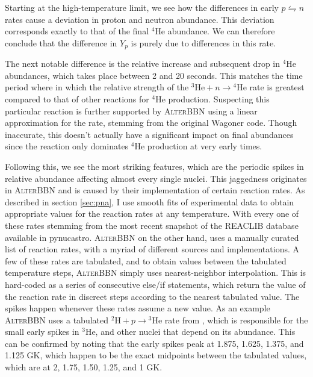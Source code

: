 Starting at the high-temperature limit, we see how the differences in early $p\leftrightharpoons n$ rates cause a deviation in proton and neutron abundance. This deviation corresponds exactly to that of the final ${}^4$He abundance. We can therefore conclude that the difference in $Y_p$ is purely due to differences in this rate. 

The next notable difference is the relative increase and subsequent drop in ${}^4\text{He}$ abundances, which takes place between 2 and 20 seconds. This matches the time period where in which the relative strength of the ${}^3\text{He}+n\rightarrow {}^4\text{He}$ rate is greatest compared to that of other reactions for ${}^4$He production. Suspecting this particular reaction is further supported by \textsc{AlterBBN} using a linear approximation for the rate, stemming from the original Wagoner code\cite{Wagoner69}. Though inaccurate, this doesn't actually have a significant impact on final abundances since the reaction only dominates ${}^4\text{He}$ production at very early times. 

Following this, we see the most striking features, which are the periodic spikes in relative abundance affecting almost every single nuclei. This jaggedness originates in \textsc{AlterBBN} and is caused by their implementation of certain reaction rates. As described in section \ref{sec:pna}, I use smooth fits of experimental data to obtain appropriate values for the reaction rates at any temperature. With every one of these rates stemming from the most recent snapshot of the REACLIB database\cite{REACLIB} available in pynucastro\cite{pynucastro2}. \textsc{AlterBBN} on the other hand, uses a manually curated list of reaction rates, with a myriad of different sources and implementations. A few of these rates are tabulated, and to obtain values between the tabulated temperature steps, \textsc{AlterBBN} simply uses nearest-neighbor interpolation. This is hard-coded as a series of consecutive else/if statements, which return the value of the reaction rate in discreet steps according to the nearest tabulated value. The spikes happen whenever these rates assume a new value. As an example \textsc{AlterBBN} uses a tabulated ${}^2\text{H}+p\rightarrow {}^3\text{He}$ rate from \textcite{Coc_et_al_2015}, which is responsible for the small early spikes in ${}^3\text{He}$, and other nuclei that depend on its abundance. This can be confirmed by noting that the early spikes peak at 1.875, 1.625, 1.375, and 1.125 GK, which happen to be the exact midpoints between the tabulated values, which are at 2, 1.75, 1.50, 1.25, and 1 GK. 


